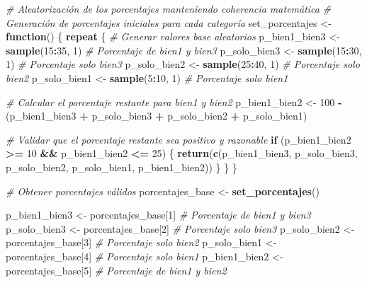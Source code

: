 \documentclass[
]{article}
\newenvironment{Shaded}{\begin{snugshade}}{\end{snugshade}}
\newcommand{\CommentTok}[1]{\textcolor[rgb]{0.56,0.35,0.01}{\textit{#1}}}
\newcommand{\ControlFlowTok}[1]{\textcolor[rgb]{0.13,0.29,0.53}{\textbf{#1}}}
\newcommand{\DecValTok}[1]{\textcolor[rgb]{0.00,0.00,0.81}{#1}}
\newcommand{\FunctionTok}[1]{\textcolor[rgb]{0.13,0.29,0.53}{\textbf{#1}}}
\newcommand{\NormalTok}[1]{#1}
\newcommand{\OtherTok}[1]{\textcolor[rgb]{0.56,0.35,0.01}{#1}}
\newcommand{\SpecialCharTok}[1]{\textcolor[rgb]{0.81,0.36,0.00}{\textbf{#1}}}
\begin{document}
\begin{Shaded}
\begin{Highlighting}[]
\CommentTok{\# Aleatorización de los porcentajes manteniendo coherencia matemática}
\CommentTok{\# Generación de porcentajes iniciales para cada categoría}
\NormalTok{set\_porcentajes }\OtherTok{\textless{}{-}} \ControlFlowTok{function}\NormalTok{() \{}
  \ControlFlowTok{repeat}\NormalTok{ \{}
    \CommentTok{\# Generar valores base aleatorios}
\NormalTok{    p\_bien1\_bien3 }\OtherTok{\textless{}{-}} \FunctionTok{sample}\NormalTok{(}\DecValTok{15}\SpecialCharTok{:}\DecValTok{35}\NormalTok{, }\DecValTok{1}\NormalTok{)  }\CommentTok{\# Porcentaje de bien1 y bien3}
\NormalTok{    p\_solo\_bien3 }\OtherTok{\textless{}{-}} \FunctionTok{sample}\NormalTok{(}\DecValTok{15}\SpecialCharTok{:}\DecValTok{30}\NormalTok{, }\DecValTok{1}\NormalTok{)   }\CommentTok{\# Porcentaje solo bien3}
\NormalTok{    p\_solo\_bien2 }\OtherTok{\textless{}{-}} \FunctionTok{sample}\NormalTok{(}\DecValTok{25}\SpecialCharTok{:}\DecValTok{40}\NormalTok{, }\DecValTok{1}\NormalTok{)   }\CommentTok{\# Porcentaje solo bien2}
\NormalTok{    p\_solo\_bien1 }\OtherTok{\textless{}{-}} \FunctionTok{sample}\NormalTok{(}\DecValTok{5}\SpecialCharTok{:}\DecValTok{10}\NormalTok{, }\DecValTok{1}\NormalTok{)    }\CommentTok{\# Porcentaje solo bien1}

    \CommentTok{\# Calcular el porcentaje restante para bien1 y bien2}
\NormalTok{    p\_bien1\_bien2 }\OtherTok{\textless{}{-}} \DecValTok{100} \SpecialCharTok{{-}}\NormalTok{ (p\_bien1\_bien3 }\SpecialCharTok{+}\NormalTok{ p\_solo\_bien3 }\SpecialCharTok{+}\NormalTok{ p\_solo\_bien2 }\SpecialCharTok{+}\NormalTok{ p\_solo\_bien1)}

    \CommentTok{\# Validar que el porcentaje restante sea positivo y razonable}
    \ControlFlowTok{if}\NormalTok{ (p\_bien1\_bien2 }\SpecialCharTok{\textgreater{}=} \DecValTok{10} \SpecialCharTok{\&\&}\NormalTok{ p\_bien1\_bien2 }\SpecialCharTok{\textless{}=} \DecValTok{25}\NormalTok{) \{}
      \FunctionTok{return}\NormalTok{(}\FunctionTok{c}\NormalTok{(p\_bien1\_bien3, p\_solo\_bien3, p\_solo\_bien2, p\_solo\_bien1, p\_bien1\_bien2))}
\NormalTok{    \}}
\NormalTok{  \}}
\NormalTok{\}}

\CommentTok{\# Obtener porcentajes válidos}
\NormalTok{porcentajes\_base }\OtherTok{\textless{}{-}} \FunctionTok{set\_porcentajes}\NormalTok{()}

\NormalTok{p\_bien1\_bien3 }\OtherTok{\textless{}{-}}\NormalTok{ porcentajes\_base[}\DecValTok{1}\NormalTok{]  }\CommentTok{\# Porcentaje de bien1 y bien3}
\NormalTok{p\_solo\_bien3 }\OtherTok{\textless{}{-}}\NormalTok{ porcentajes\_base[}\DecValTok{2}\NormalTok{]   }\CommentTok{\# Porcentaje solo bien3}
\NormalTok{p\_solo\_bien2 }\OtherTok{\textless{}{-}}\NormalTok{ porcentajes\_base[}\DecValTok{3}\NormalTok{]   }\CommentTok{\# Porcentaje solo bien2}
\NormalTok{p\_solo\_bien1 }\OtherTok{\textless{}{-}}\NormalTok{ porcentajes\_base[}\DecValTok{4}\NormalTok{]   }\CommentTok{\# Porcentaje solo bien1}
\NormalTok{p\_bien1\_bien2 }\OtherTok{\textless{}{-}}\NormalTok{ porcentajes\_base[}\DecValTok{5}\NormalTok{]  }\CommentTok{\# Porcentaje de bien1 y bien2}


\end{Highlighting}
\end{Shaded}
\end{document}
